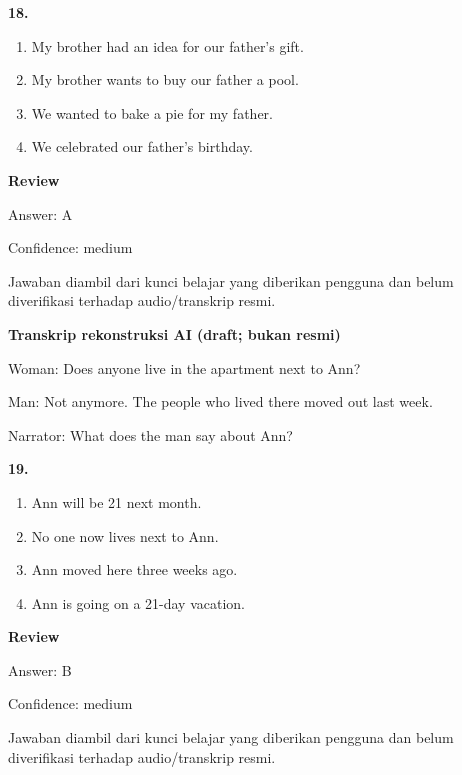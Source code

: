 \documentclass[12pt]{article}
\begin{document}
\noindent\textbf{18.}
\begin{enumerate}[label=(\Alph*),leftmargin=*,itemsep=0.2em]
\item My brother had an idea for our father's gift.
\item My brother wants to buy our father a pool.
\item We wanted to bake a pie for my father.
\item We celebrated our father's birthday.
\end{enumerate}
\par
\begingroup
\setlength{\parskip}{0pt}
\setlength{\parindent}{0pt}
\textbf{Review}\par
Answer: A\par
Confidence: medium\par
Jawaban diambil dari kunci belajar yang diberikan pengguna dan belum diverifikasi terhadap audio/transkrip resmi.\par
\endgroup
\par
\vspace{0.25\baselineskip}
\begin{exampleblock}
\textbf{Transkrip rekonstruksi AI (draft; bukan resmi)}\par
Woman: Does anyone live in the apartment next to Ann?\par
Man: Not anymore. The people who lived there moved out last week.\par
Narrator: What does the man say about Ann?\par
\end{exampleblock}
\noindent\textbf{19.}
\begin{enumerate}[label=(\Alph*),leftmargin=*,itemsep=0.2em]
\item Ann will be 21 next month.
\item No one now lives next to Ann.
\item Ann moved here three weeks ago.
\item Ann is going on a 21-day vacation.
\end{enumerate}
\par
\begingroup
\setlength{\parskip}{0pt}
\setlength{\parindent}{0pt}
\textbf{Review}\par
Answer: B\par
Confidence: medium\par
Jawaban diambil dari kunci belajar yang diberikan pengguna dan belum diverifikasi terhadap audio/transkrip resmi.\par
\endgroup
\par
\vspace{0.25\baselineskip}
\end{document}
